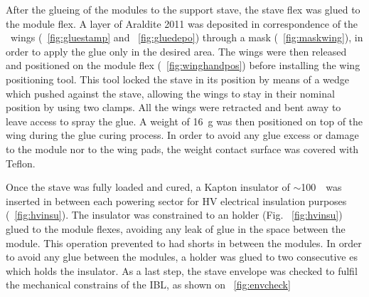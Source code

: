 \label{subsec:WingGluingWireBonding}
After the glueing of the modules to the support stave, the stave flex was glued to the module flex.
A layer of Araldite 2011 was deposited in correspondence of the \staveflex\ wings (~\ref{fig:gluestamp} and ~\ref{fig:gluedepo}) through a mask (~\ref{fig:maskwing}), in order to apply the glue only in the desired area.
The wings were then released and positioned on the module flex (~\ref{fig:winghandpos}) before installing the wing positioning tool. This tool locked the stave in its position by means of a wedge which pushed against the stave, allowing the wings to stay in their nominal position by using two clamps. All the wings were retracted and bent away to leave access to spray the glue. A weight of 16~g was then positioned on top of the wing during the glue curing process. In order to avoid any glue excess or damage to the module nor to the wing pads, the weight contact surface was covered with Teflon.

Once the stave was fully loaded and cured, a Kapton insulator of $\sim$100~\microm\ was inserted in between each powering sector for HV electrical insulation purposes (~\ref{fig:hvinsu}). The insulator was constrained to an holder (Fig. ~\ref{fig:hvinsu}) glued to the module flexes, avoiding any leak of glue in the space between the module. This operation prevented to had shorts in between the modules.
In order to avoid any glue between the modules, a holder was glued to two consecutive \moduleflex es which holds the insulator. As a last step, the stave envelope was checked to fulfil the mechanical constrains of the IBL, as shown on ~\ref{fig:envcheck}

